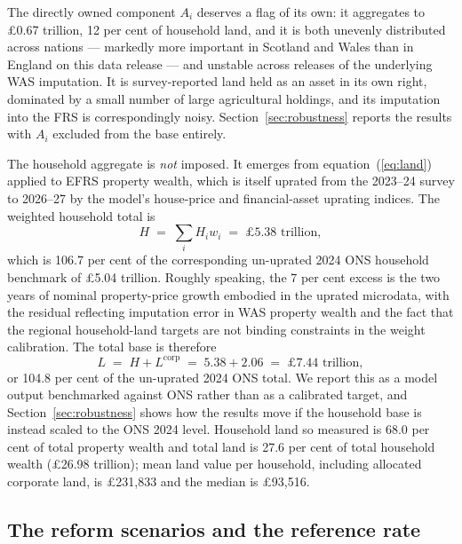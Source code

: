The directly owned component $A_i$ deserves a flag of its own: it aggregates to \pounds 0.67 trillion, 12 per cent of household land, and it is both unevenly distributed across nations --- markedly more important in Scotland and Wales than in England on this data release --- and unstable across releases of the underlying WAS imputation. It is survey-reported land held as an asset in its own right, dominated by a small number of large agricultural holdings, and its imputation into the FRS is correspondingly noisy. Section~\ref{sec:robustness} reports the results with $A_i$ excluded from the base entirely.

The household aggregate is \emph{not} imposed. It emerges from equation~(\ref{eq:land}) applied to EFRS property wealth, which is itself uprated from the 2023--24 survey to 2026--27 by the model's house-price and financial-asset uprating indices. The weighted household total is
\begin{equation}
H \;=\; \sum_i H_i w_i \;=\; \pounds 5.38 \text{ trillion},
\end{equation}
which is 106.7 per cent of the corresponding un-uprated 2024 ONS household benchmark of \pounds 5.04 trillion. Roughly speaking, the 7 per cent excess is the two years of nominal property-price growth embodied in the uprated microdata, with the residual reflecting imputation error in WAS property wealth and the fact that the regional household-land targets are not binding constraints in the weight calibration. The total base is therefore
\begin{equation}
L \;=\; H + L^{\mathrm{corp}} \;=\; 5.38 + 2.06 \;=\; \pounds 7.44 \text{ trillion},
\end{equation}
or 104.8 per cent of the un-uprated 2024 ONS total. We report this as a model output benchmarked against ONS rather than as a calibrated target, and Section~\ref{sec:robustness} shows how the results move if the household base is instead scaled to the ONS 2024 level. Household land so measured is 68.0 per cent of total property wealth and total land is 27.6 per cent of total household wealth (\pounds 26.98 trillion); mean land value per household, including allocated corporate land, is \pounds 231{,}833 and the median is \pounds 93{,}516.

\subsection{The reform scenarios and the reference rate}

